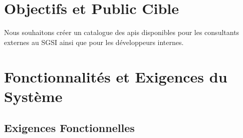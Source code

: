 \section{Objectifs et Public Cible}
Nous souhaitons créer un catalogue des apis disponibles pour les consultants externes au SGSI ainsi que pour les développeurs internes.


\section{Fonctionnalités et Exigences du Système}

\subsection{Exigences Fonctionnelles}

